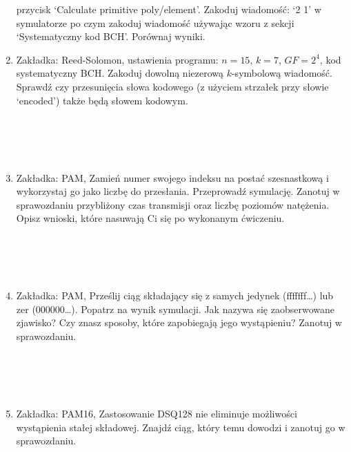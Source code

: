\begin{enumerate}
    przycisk `Calculate primitive poly/element'.
    Zakoduj wiadomość: `2 1' w symulatorze po czym zakoduj wiadomość
    używając wzoru z sekcji `Systematyczny kod BCH'. Porównaj wyniki.
    \newpage
    \item Zakładka: Reed-Solomon, ustawienia programu: $n = 15$, $k=7$, $GF = 2^4$,
    kod systematyczny BCH.
    Zakoduj dowolną niezerową $k$-symbolową wiadomość. Sprawdź czy przesunięcia słowa kodowego
    (z użyciem strzałek przy słowie `encoded') także będą słowem kodowym. \\ \\ \\ \\ \\
    \item Zakładka: PAM, Zamień numer swojego indeksu na postać szesnastkową i wykorzystaj go jako liczbę do przesłania. Przeprowadź symulację. Zanotuj w sprawozdaniu
    przybliżony czas transmisji oraz liczbę poziomów natężenia. Opisz wnioski, które nasuwają Ci się po wykonanym ćwiczeniu.  \\ \\ \\ \\ \\
    \item Zakładka: PAM, Prześlij ciąg składający się z samych jedynek (fffffff\dots) lub zer (000000\dots). Popatrz na wynik symulacji. Jak nazywa się zaobserwowane zjawisko? Czy znasz sposoby,
    które zapobiegają jego wystąpieniu? Zanotuj w sprawozdaniu.  \\ \\ \\ \\ \\
    \item Zakładka: PAM16, Zastosowanie DSQ128 nie eliminuje możliwości wystąpienia stałej składowej. Znajdź ciąg, który
    temu dowodzi i zanotuj go w sprawozdaniu.
\end{enumerate}
